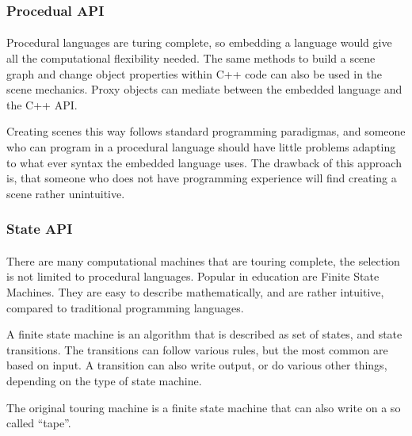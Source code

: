 \subsubsection{Procedual API}
\paragraph{}
Procedural languages are turing complete, so embedding a language would give all the computational flexibility needed. The same methods to build a scene graph and change object properties within C++ code can also be used in the scene mechanics. Proxy objects can mediate between the embedded language and the C++ API.

Creating scenes this way follows standard programming paradigmas, and someone who can program in a procedural language should have little problems adapting to what ever syntax the embedded language uses. The drawback of this approach is, that someone who does not have programming experience will find creating a scene rather unintuitive.

\subsubsection{State API}
\paragraph{}
There are many computational machines that are touring complete, the selection is not limited to procedural languages. Popular in education are Finite State Machines. They are easy to describe mathematically, and are rather intuitive, compared to traditional programming languages.

A finite state machine is an algorithm that is described as set of states, and state transitions. The transitions can follow various rules, but the most common are based on input. A transition can also write output, or do various other things, depending on the type of state machine.

The original touring machine is a finite state machine that can also write on a so called ``tape''.


